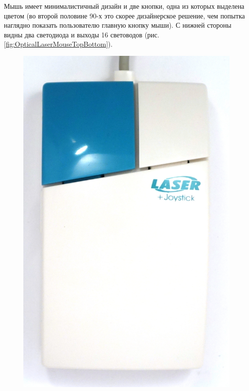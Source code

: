 \documentclass[11pt, a4paper]{article}
\begin{document}
Мышь имеет минималистичный дизайн и две кнопки, одна из которых выделена цветом (во второй половине 90-х это скорее дизайнерское решение, чем попытка наглядно показать пользователю главную кнопку мыши). С нижней стороны видны два светодиода и выходы 16 световодов (рис. \ref{fig:OpticalLaserMouseTopBottom}).

\begin{figure}[h]
    \centering
    \includegraphics[scale=0.4]{1996_hi-bon_laser_mouse/top_60.jpg}

\end{figure}
\end{document}
